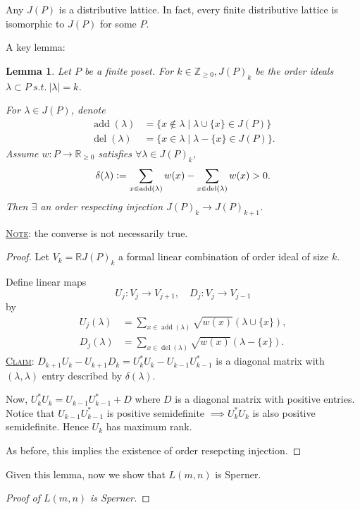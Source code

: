 \documentclass{report}
\newcommand{\R}{\mathbb{R}}
\newcommand{\Z}{\mathbb{Z}}
\newcommand{\st}{\ s.t.\ }
\def \del {\operatorname{del}}
\def \add {\operatorname{add}}
\newcommand{\defeq}{\vcentcolon=}
\newcommand{\fancyem}[1]{\underline{\textsc{#1}}}
\newtheorem{lemma}{Lemma}[section]
\theoremstyle{definition}
\theoremstyle{remark}
\numberwithin{equation}{section}
\begin{document}
Any $J(P)$ is a distributive lattice. In fact, every finite distributive lattice is isomorphic to $J(P)$ for some $P$.

A key lemma:
\begin{lemma}
    Let $P$ be a finite poset. For $k \in \Z_{\geq 0}, J(P)_k$ be the order ideals $\lambda \subset P \st |\lambda| = k$.

    For $\lambda \in J(P)$, denote \begin{align*}
        \add(\lambda) & = \{x \notin \lambda \mid \lambda \cup \{x\} \in J(P)\} \\
        \del(\lambda) & = \{x \in \lambda \mid \lambda - \{x\} \in J(P)\}.
    \end{align*}
    Assume $w: P \to \R_{\geq 0}$ satisfies $\forall \lambda \in J(P)_k$, \[
        \delta(\lambda) \defeq \sum_{x \in \add(\lambda)} w(x) - \sum_{x \in \del(\lambda)}w(x) > 0.    
    \]
    Then $\exists$ an order respecting injection $J(P)_k \to J(P)_{k+1}$.
\end{lemma}
\fancyem{Note}: the converse is not necessarily true.

\begin{proof}
    Let $V_k = \R J(P)_k$ a formal linear combination of order ideal of size $k$.

    Define linear maps \[
        U_j: V_j \to V_{j + 1}, \quad D_j: V_j \to V_{j - 1}    
    \] by \begin{align*}
        U_j(\lambda) & = \sum_{x \in \add(\lambda)} \sqrt{w(x)}\left(\lambda \cup \{x\}\right), \\
        D_j(\lambda) & = \sum_{x \in \del(\lambda)} \sqrt{w(x)}\left(\lambda - \{x\}\right).
    \end{align*}
    \fancyem{Claim}: $D_{k+1}U_k - U_{k+1}D_k = U^*_kU_k - U_{k-1}U^*_{k-1}$ is a diagonal matrix with $(\lambda, \lambda)$ entry described by $\delta(\lambda)$.

    Now, $U^*_kU_k = U_{k-1}U^*_{k-1} + D$ where $D$ is a diagonal matrix with positive entries. Notice that $U_{k-1}U^*_{k-1}$ is positive semidefinite $\implies U^*_kU_k$ is also positive semidefinite. Hence $U_k$ has maximum rank.

    As before, this implies the existence of order resepcting injection.
\end{proof}

Given this lemma, now we show that $L(m, n)$ is Sperner.
\begin{proof}[Proof of $L(m, n)$ is Sperner]
    
\end{proof}
\end{document}

